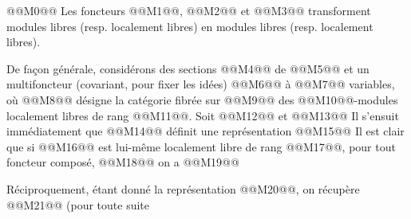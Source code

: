
@@M0@@
Les
foncteurs @@M1@@, @@M2@@ et @@M3@@ transforment modules libres (resp. localement libres) en modules libres (resp. localement libres).

De façon générale, considérons des sections @@M4@@ de @@M5@@ et un multifoncteur (covariant, pour fixer les idées)
@@M6@@
à @@M7@@ variables, où @@M8@@ désigne la catégorie fibrée sur @@M9@@ des @@M10@@-modules localement libres de rang @@M11@@. Soit
@@M12@@
et
@@M13@@
Il s'ensuit immédiatement que @@M14@@ définit une représentation
@@M15@@
Il est clair que si @@M16@@ est lui-même localement libre de rang @@M17@@, pour tout foncteur composé,
@@M18@@
on a
@@M19@@

Réciproquement, étant donné la représentation @@M20@@, on récupère @@M21@@ (pour toute suite
